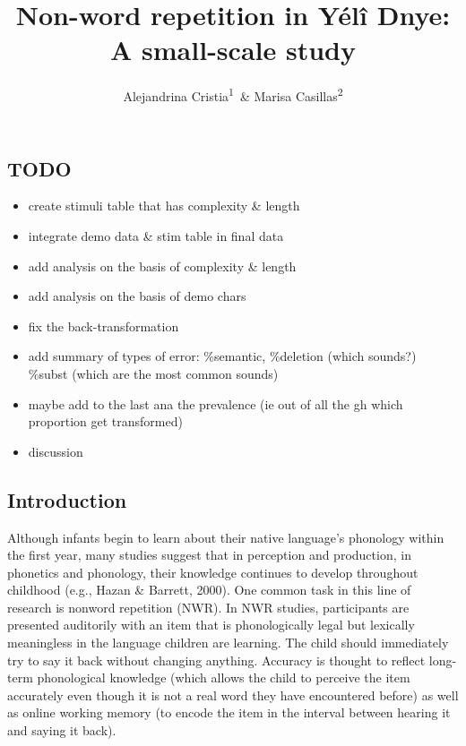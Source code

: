 \documentclass[english,,man,floatsintext]{apa6}
\title{Non-word repetition in Yélî Dnye: A small-scale study}
\author{Alejandrina Cristia\textsuperscript{1}~\& Marisa Casillas\textsuperscript{2}}
\date{}
\affiliation{
\vspace{0.5cm}
\textsuperscript{1} LSCP, Département d’études cognitives, ENS, EHESS, CNRS, Université PSL\\\textsuperscript{2} Max Planck Institute for Psycholinguistics}
\providecommand{\tightlist}{%
  \setlength{\itemsep}{0pt}\setlength{\parskip}{0pt}}
\begin{document}
\maketitle

\hypertarget{todo}{%
\subsection{TODO}\label{todo}}

\begin{itemize}
\tightlist
\item
  create stimuli table that has complexity \& length
\item
  integrate demo data \& stim table in final data
\item
  add analysis on the basis of complexity \& length
\item
  add analysis on the basis of demo chars
\item
  fix the back-transformation
\item
  add summary of types of error: \%semantic, \%deletion (which sounds?) \%subst (which are the most common sounds)
\item
  maybe add to the last ana the prevalence (ie out of all the gh which proportion get transformed)
\item
  discussion
\end{itemize}

\hypertarget{introduction}{%
\subsection{Introduction}\label{introduction}}

Although infants begin to learn about their native language's phonology within the first year, many studies suggest that in perception and production, in phonetics and phonology, their knowledge continues to develop throughout childhood (e.g., Hazan \& Barrett, 2000). One common task in this line of research is nonword repetition (NWR). In NWR studies, participants are presented auditorily with an item that is phonologically legal but lexically meaningless in the language children are learning. The child should immediately try to say it back without changing anything. Accuracy is thought to reflect long-term phonological knowledge (which allows the child to perceive the item accurately even though it is not a real word they have encountered before) as well as online working memory (to encode the item in the interval between hearing it and saying it back).
\end{document}
